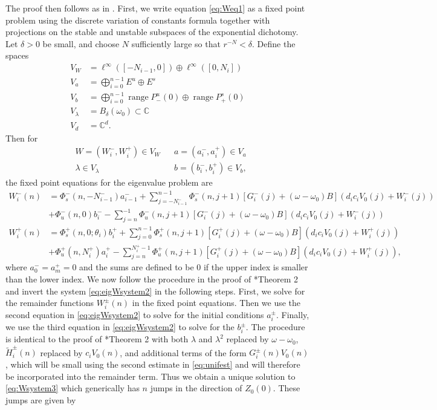 \documentclass[12pt,reqno]{amsart}
\def\C{{\mathbb C}}
\DeclareMathOperator{\ran}{range}
\begin{document}
The proof then follows as in \cites{Parker2020,Sandstede1998}. First, we write equation \cref{eq:Weq1} as a fixed point problem using the discrete variation of constants formula together with projections on the stable and unstable subspaces of the exponential dichotomy. Let $\delta > 0$ be small, and choose $N$ sufficiently large so that $r^{-N} < \delta$. Define the spaces
\begin{align*}
V_W &= \ell^\infty([-N_{i-1}, 0]) \oplus \ell^\infty([0, N_i])  \\
V_a &= \bigoplus_{i=0}^{n-1} E^u \oplus E^s \\
V_b &= \bigoplus_{i=0}^{n-1} \ran P_-^u(0) \oplus \ran P_+^s(0)\\
V_\lambda &= B_\delta(\omega_0) \subset \C \\
V_d &= \C^d.
\end{align*}
Then for
\begin{align*}
&W = (W_i^-, W_i^+) \in V_W  && a = (a_i^-, a_i^+) \in V_a \\
&\lambda \in V_\lambda  &&b = (b_i^-, b_i^+) \in V_b,
\end{align*}
the fixed point equations for the eigenvalue problem are
\begin{equation*}\label{fpeig}
\begin{aligned}
W_i^-(n) &= 
\Phi_s^-(n, -N_{i-1}^-) a_{i-1}^- + \sum_{j = -N_{i-1}^-}^{n-1} \Phi_s^-(n, j+1)
[G_i^-(j) + (\omega - \omega_0) B](d_i c_i V_0(j) + W_i^-(j))
 \\
&+ \Phi_u^-(n, 0) b_i^- - \sum_{j = n}^{-1} \Phi_u^-(n, j+1) 
[G_i^-(j) + (\omega - \omega_0) B](d_i c_i V_0(j) + W_i^-(j))\\
W_i^+(n) &= \Phi_s^+(n, 0; \theta_i) b_i^+ + \sum_{j = 0}^{n-1} \Phi_s^+(n, j+1) 
[G_i^+(j) + (\omega - \omega_0) B](d_i c_i V_0(j) + W_i^+(j))\\
&+ \Phi_u^+(n, N_i^+) a_i^+ - \sum_{j = n}^{N_i^+-1} \Phi_u^+(n, j+1) 
[G_i^+(j) + (\omega - \omega_0) B](d_i c_i V_0(j) + W_i^+(j)),
\end{aligned}
\end{equation*}
where $a_0^- = a_m^+ = 0$ and the sums are defined to be $0$ if the upper index is smaller than the lower index. We now follow the procedure in the proof of \cite{Parker2020}*{Theorem 2} and invert the system \cref{eq:eigWsystem2} in the following steps. First, we solve for the remainder functions $W_i^\pm(n)$ in the fixed point equations. Then we use the second equation in \cref{eq:eigWsystem2} to solve for the  initial conditions $a_i^\pm$. Finally, we use the third equation in \cref{eq:eigWsystem2} to solve for the $b_i^\pm$. The procedure is identical to the proof of \cite{Parker2020}*{Theorem 2} with both $\lambda$ and $\lambda^2$ replaced by $\omega - \omega_0$, $\tilde{H}_i^\pm(n)$ replaced by $c_i V_0(n)$, and additional terms of the form $G_i^\pm(n) V_0(n)$, which will be small using the second estimate in \cref{eq:unifest} and will therefore be incorporated into the remainder term. Thus we obtain a unique solution to \cref{eq:Wsystem3} which generically has $n$ jumps in the direction of $Z_0(0)$. These jumps are given by 
\end{document}
